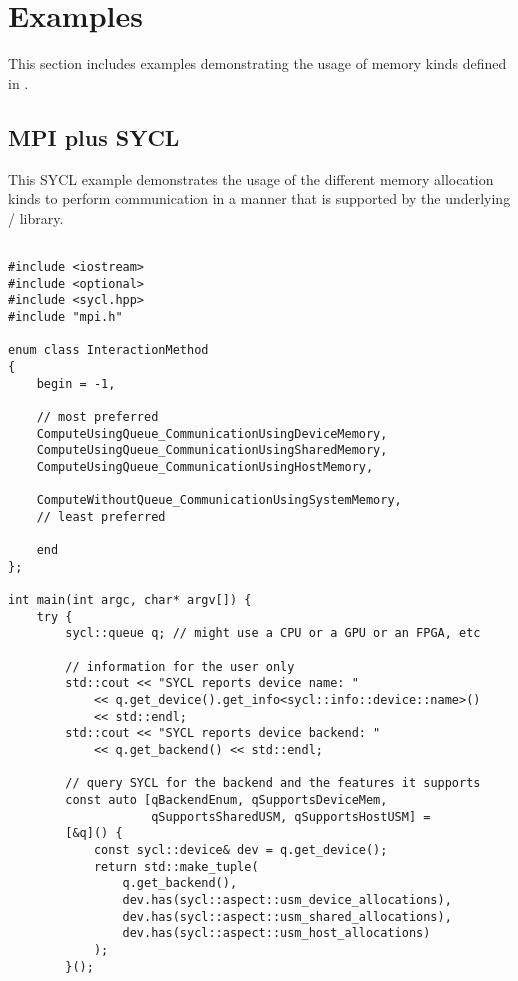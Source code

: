 \chapter{Examples}
\label{chap:examples}

This section includes examples demonstrating the usage of
memory kinds defined in .

\section{MPI plus SYCL}

\begin{example}
\label{example:alloc-kind-spm-sycl}
This SYCL example demonstrates the usage of the different
memory allocation kinds to perform communication in a manner
that is supported by the underlying \mpi/ library.
\begin{lstlisting}[language={[MPI]C++}]

#include <iostream>
#include <optional>
#include <sycl.hpp>
#include "mpi.h"

enum class InteractionMethod
{
    begin = -1,

    // most preferred
    ComputeUsingQueue_CommunicationUsingDeviceMemory,
    ComputeUsingQueue_CommunicationUsingSharedMemory,
    ComputeUsingQueue_CommunicationUsingHostMemory,

    ComputeWithoutQueue_CommunicationUsingSystemMemory,
    // least preferred

    end
};

int main(int argc, char* argv[]) {
    try {
        sycl::queue q; // might use a CPU or a GPU or an FPGA, etc

        // information for the user only
        std::cout << "SYCL reports device name: "
            << q.get_device().get_info<sycl::info::device::name>()
            << std::endl;
        std::cout << "SYCL reports device backend: "
            << q.get_backend() << std::endl;

        // query SYCL for the backend and the features it supports
        const auto [qBackendEnum, qSupportsDeviceMem,
                    qSupportsSharedUSM, qSupportsHostUSM] =
        [&q]() {
            const sycl::device& dev = q.get_device();
            return std::make_tuple(
                q.get_backend(),
                dev.has(sycl::aspect::usm_device_allocations),
                dev.has(sycl::aspect::usm_shared_allocations),
                dev.has(sycl::aspect::usm_host_allocations)
            );
        }();


\end{lstlisting}
\end{example}
